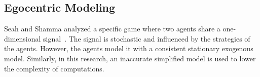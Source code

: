 \subsection{Egocentric Modeling}
Seah and Shamma analyzed a specific game where two agents share a one-dimensional signal~\cite{seah_shamma:2008}.
The signal is stochastic and influenced by the strategies of the agents.
However, the agents model it with a consistent stationary exogenous model.
Similarly, in this research, an inaccurate  simplified model is used to lower the complexity of computations.
